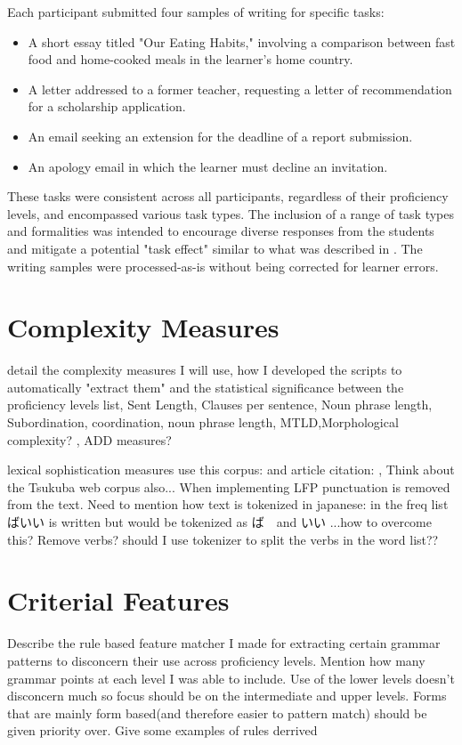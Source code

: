 Each participant submitted four samples of writing for specific tasks:
\begin{itemize}
    \item A short essay titled "Our Eating Habits," involving a comparison between fast food and home-cooked meals in the learner's home country.
    \item A letter addressed to a former teacher, requesting a letter of recommendation for a scholarship application.
    \item An email seeking an extension for the deadline of a report submission.
    \item An apology email in which the learner must decline an invitation.
\end{itemize}
These tasks were consistent across all participants, regardless of their proficiency levels, and encompassed various task types. The inclusion of a range of task types and formalities was intended to encourage diverse responses from the students and mitigate a potential "task effect" similar to what  was described in \cite{Alexpoulou2017}. The writing samples were processed-as-is without being corrected for learner errors.

\section{Complexity Measures}
detail the complexity measures I will use, how I developed the scripts to automatically "extract them" and the statistical significance between the proficiency levels
list, Sent Length, Clauses per sentence, Noun phrase length,  Subordination, coordination, noun phrase length, MTLD,Morphological complexity? , ADD measures?

lexical sophistication measures use this corpus: \cite{BCCWJ_List} and article citation: \cite{maekawa2014}, Think
about the Tsukuba web corpus also...
When implementing LFP punctuation is removed from the text. Need to mention how text is tokenized in japanese: in
the freq list ばいい is written but would be tokenized as ば　and いい ...how to overcome this? Remove verbs? should I use
tokenizer to split the verbs in the word list??

\section{Criterial Features}
Describe the rule based feature matcher I made for extracting certain grammar patterns to disconcern their use
across proficiency levels. Mention how many grammar points at each level I was able to include. Use of the lower
levels doesn't disconcern much so focus should be on the intermediate and upper levels.  Forms that are mainly form
based(and therefore easier to pattern match) should be given priority over. Give some examples of rules derrived

